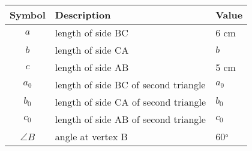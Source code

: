 \begin{tabular}{|c|p{3cm}|p{3cm}|}
    \hline
    Symbol & Description & Value\\
    \hline
    $a$ & length of side BC & 6 cm\\
    \hline
    $b$ & length of side CA & $b$\\
    \hline
    $c$ & length of side AB & 5 cm\\
    \hline
    $a_0$ & length of side BC of second triangle & $a_0$\\
    \hline
    $b_0$ & length of side CA of second triangle & $b_0$\\
    \hline
    $c_0$ & length of side AB of second triangle & $c_0$\\
    \hline
    $\angle B$ & angle at vertex B & 60$\degree$\\
    \hline
\end{tabular}